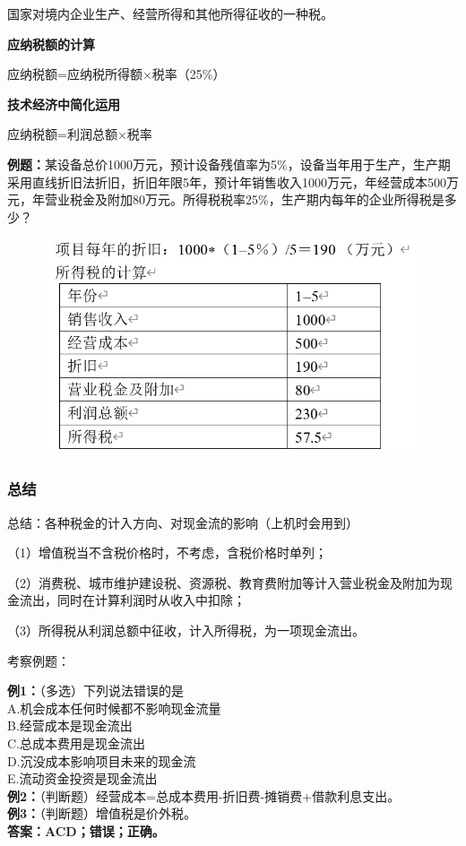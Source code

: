 国家对境内企业生产、经营所得和其他所得征收的一种税。

\textbf{应纳税额的计算}

应纳税额=应纳税所得额×税率（25\%）

\textbf{技术经济中简化运用}

应纳税额=利润总额×税率

\noindent \textbf{例题：}某设备总价1000万元，预计设备残值率为5\%，设备当年用于生产，生产期采用直线折旧法折旧，折旧年限5年，预计年销售收入1000万元，年经营成本500万元，年营业税金及附加80万元。所得税税率25\%，生产期内每年的企业所得税是多少？
\begin{figure}[H]
    \centering
    \includegraphics[width=0.8\linewidth]{image/税金-企业所得税.png}
\end{figure}

\subsubsection{总结}
总结：各种税金的计入方向、对现金流的影响（上机时会用到）

（1）增值税当不含税价格时，不考虑，含税价格时单列；

（2）消费税、城市维护建设税、资源税、教育费附加等计入营业税金及附加为现金流出，同时在计算利润时从收入中扣除；

（3）所得税从利润总额中征收，计入所得税，为一项现金流出。

\noindent 考察例题：

\noindent \textbf{例1：}（多选）下列说法错误的是\\
A.机会成本任何时候都不影响现金流量\\
B.经营成本是现金流出\\
C.总成本费用是现金流出\\
D.沉没成本影响项目未来的现金流\\
E.流动资金投资是现金流出\\
\textbf{例2：}（判断题）经营成本=总成本费用-折旧费-摊销费+借款利息支出。\\
\textbf{例3：}（判断题）增值税是价外税。\\
\textbf{答案：ACD；错误；正确。}

